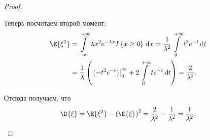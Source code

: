 \begin{proof}
\begin{enumerate}
		Теперь посчитаем второй момент:
		\begin{align}
			\E{\xi^2} &= \int\limits_{-\infty}^{+\infty} \lambda x^2 e^{-\lambda x}I\left\{x \geq 0\right\}\,\mathrm{d}x = \frac{1}{\lambda^2}\int\limits_{0}^{+\infty} t^{2}e^{-t}\,\mathrm{d}t \\ 
			&= \frac{1}{\lambda}\left(\left.(-t^{2}e^{-t})\right|_{0}^{\infty} + 2\int\limits_{0}^{+\infty} te^{-t}\,\mathrm{d}t\right) = \frac{2}{\lambda^2}.
		\end{align}
		
		Отсюда получаем, что
		\[\D{\xi} = \E{\xi^2} - \left(\E{\xi}\right)^2 = \frac{2}{\lambda^2} - \frac{1}{\lambda^2} = \frac{1}{\lambda^2}.\qedhere\]
	\end{enumerate}
\end{proof}